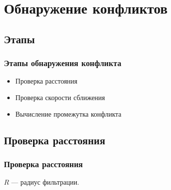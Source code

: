 \documentclass[10pt,t]{beamer}
\begin{document}
\section[Обнаружение конфликтов]{Обнаружение конфликтов}
\subsection[Этапы]{Этапы}
\begin{frame}
\frametitle{Этапы обнаружения конфликта}
\small


\begin{itemize}
	\item Проверка расстояния 
	\item Проверка скорости сближения
	\item Вычисление промежутка конфликта
\end{itemize}

\end{frame}
\subsection[Проверка расстояния]{Проверка расстояния}
\begin{frame}
\frametitle{Проверка расстояния}
\small

\begin{center}
\end{center}

$R$ --- радиус фильтрации.
\end{frame}

\end{document}
